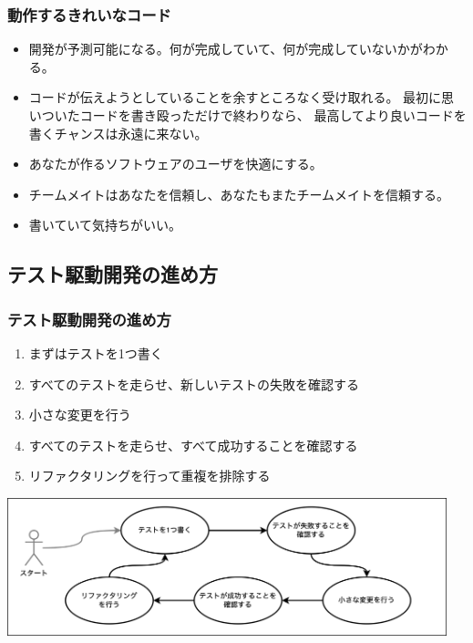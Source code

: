 \documentclass[aspectratio=169]{beamer}
\begin{document}
\begin{frame}[fragile]\frametitle{動作するきれいなコード}
  \begin{itemize}
    \item 開発が予測可能になる。何が完成していて、何が完成していないかがわかる。
    \item コードが伝えようとしていることを余すところなく受け取れる。
      最初に思いついたコードを書き殴っただけで終わりなら、
      最高してより良いコードを書くチャンスは永遠に来ない。

    \large \color{blue}
    \item あなたが作るソフトウェアのユーザを快適にする。
    \item チームメイトはあなたを信頼し、あなたもまたチームメイトを信頼する。
    \item 書いていて気持ちがいい。
  \end{itemize}
\end{frame}

\subsection{テスト駆動開発の進め方}
\begin{frame}\frametitle{テスト駆動開発の進め方}
  \begin{enumerate}
    \item まずはテストを1つ書く
    \item すべてのテストを走らせ、新しいテストの失敗を確認する
    \item 小さな変更を行う
    \item すべてのテストを走らせ、すべて成功することを確認する
    \item リファクタリングを行って重複を排除する
  \end{enumerate}

  \begin{center}
    \includegraphics[height=4cm]{asset/tdd_cycle.png}
  \end{center}
\end{frame}
\end{document}
